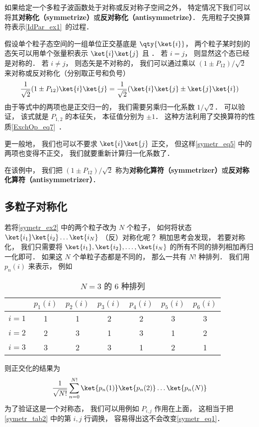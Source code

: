 

如果给定一个多粒子波函数处于对称或反对称子空间之外， 特定情况下我们可以将其\textbf{对称化（symmetrize）}或\textbf{反对称化（antisymmetrize）}． 先用粒子交换算符表示\autoref{IdPar_ex1}~的过程．

\begin{example}{}\label{symetr_ex2}
假设单个粒子态空间的一组单位正交基底是 $\qty{\ket{i}}$， 两个粒子某时刻的态矢可以用单个张量积表示 $\ket{i}\ket{j}$ 且 ． 若 $i = j$， 则显然这个态已经是对称的．  若 $i \ne j$， 则态矢是不对称的， 我们可以通过乘以 $(1 \pm P_{12})/\sqrt{2}$ 来对称或反对称化（分别取正号和负号）
\begin{equation}\label{symetr_eq5}
\frac{1}{\sqrt{2}}(1 \pm P_{12})\ket{i}\ket{j} = \frac{1}{\sqrt{2}}(\ket{i}\ket{j} \pm \ket{j}\ket{i})
\end{equation}
由于等式中的两项也是正交归一的， 我们需要另乘归一化系数 $1/\sqrt 2$． 可以验证， 该式就是 $P_{1,2}$ 的本征矢， 本征值分别为 $\pm 1$． 这种方法利用了交换算符的性质\autoref{ExchOp_eq7}~．

更一般地， 我们也可以不要求 $\ket{i}\ket{j}$ 正交， 但这样\autoref{symetr_eq5} 中的两项也变得不正交， 我们就要重新计算归一化系数了．
\end{example}

在该例中， 我们把 $(1 \pm P_{12})/\sqrt{2}$ 称为\textbf{对称化算符（symmetrizer）}或\textbf{反对称化算符（antisymmetrizer）}．

\subsection{多粒子对称化}
若将\autoref{symetr_ex2} 中的两个粒子改为 $N$ 个粒子， 如何将状态 $\ket{i_1}\ket{i_2}\dots\ket{i_N}$ （反）对称化呢？ 稍加思考会发现， 若要对称化， 我们只需要将 $\ket{i_1},\ket{i_2},\dots,\ket{i_N}$ 的所有不同的排列相加再归一化即可． 如果这 $N$ 个单粒子态都是不同的， 那么一共有 $N!$ 种排列． 我们用 $p_n(i)$ 来表示， 例如
\begin{table}[ht]
\centering
\caption{$N = 3$ 的 6 种排列}\label{symetr_tab2}
\begin{tabular}{|c|c|c|c|c|c|c|}
\hline
  & $p_1(i)$ & $p_2(i)$ & $p_3(i)$ & $p_4(i)$ & $p_5(i)$ & $p_6(i)$ \\
\hline
$i=1$ & 1 & 1 & 2 & 2 & 3 & 3 \\
\hline
$i=2$ & 2 & 3 & 1 & 3 & 1 & 2 \\
\hline
$i=3$ & 3 & 2 & 3 & 1 & 2 & 1 \\
\hline
\end{tabular}
\end{table}
则正交化的结果为
\begin{equation}\label{symetr_eq1}
\frac{1}{\sqrt{N!}}\sum_{n = 0}^{N!} \ket{p_n(1)}\ket{p_n(2)}\dots\ket{p_n(N)}
\end{equation}
为了验证这是一个对称态， 我们可以用例如 $P_{i,j}$ 作用在上面， 这相当于把\autoref{symetr_tab2} 中的第 $i,j$ 行调换， 容易得出这不会改变\autoref{symetr_eq1}．

